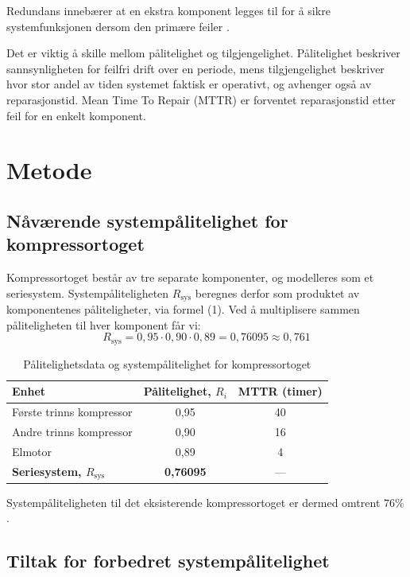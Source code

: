 Redundans innebærer at en ekstra komponent legges til for å sikre systemfunksjonen dersom den primære feiler \parencite{pedersen_redundans}.

Det er viktig å skille mellom pålitelighet og tilgjengelighet. Pålitelighet beskriver sannsynligheten for feilfri drift over en periode, mens tilgjengelighet beskriver hvor stor andel av tiden systemet faktisk er operativt, og avhenger også av reparasjonstid. Mean Time To Repair (MTTR) er forventet reparasjonstid etter feil for en enkelt komponent.

\section{Metode}
\subsection{Nåværende systempålitelighet for kompressortoget}

Kompressortoget består av tre separate komponenter, og modelleres som et seriesystem. Systempåliteligheten $R_{\text{sys}}$ beregnes derfor som produktet av komponentenes påliteligheter, via formel (1). Ved å multiplisere sammen påliteligheten til hver komponent får vi:
\[
R_{\text{sys}} = 0{,}95 \cdot 0{,}90 \cdot 0{,}89 = 0{,}76095 \approx 0{,}761
\]

\begin{table}[H]
    \centering
    \caption{Pålitelighetsdata og systempålitelighet for kompressortoget}
    \label{tab:palitelighet}
    \begin{tabular}{lcc}
        \hline
        \textbf{Enhet} & \textbf{Pålitelighet, $R_i$} & \textbf{MTTR (timer)} \\
        \hline
        Første trinns kompressor & 0{,}95 & 40 \\
        Andre trinns kompressor  & 0{,}90 & 16 \\
        Elmotor                  & 0{,}89 & 4  \\
        \hline
        \textbf{Seriesystem, $R_{\text{sys}}$} & \textbf{0{,}76095} & --- \\
        \hline
    \end{tabular}
\end{table}

Systempåliteligheten til det eksisterende kompressortoget er dermed omtrent $76\%$.


\subsection{Tiltak for forbedret systempålitelighet}

